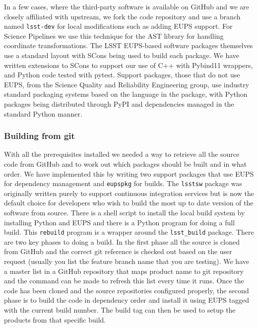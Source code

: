 In a few cases, where the third-party software is available on GitHub and we are closely affiliated with upstream, we fork the code repository and use a branch named \texttt{lsst-dev} for local modifications such as adding EUPS support.
For Science Pipelines we use this technique for the AST library\cite{2016A&C....15...33B} for handling coordinate transformations.
The LSST EUPS-based software packages themselves use a standard layout with SCons\cite{2005Scons1377085} being used to build each package.
We have written extensions to SCons to support our use of C++ with Pybind11 wrappers, and Python code tested with pytest.
Support packages, those that do not use EUPS, from the Science Quality and Reliability Engineering group, use industry standard packaging systems based on the language in the package, with Python packages being distributed through PyPI and dependencies managed in the standard Python manner.

\subsubsection{Building from git}

With all the prerequisites installed we needed a way to retrieve all the source code from GitHub and to work out which packages should be built and in what order.
We have implemented this by writing two support packages that use EUPS for dependency management and \texttt{eupspkg} for builds.
The \texttt{lsstsw} package was originally written purely to support continuous integration services but is now the default choice for developers who wish to build the most up to date version of the software from source.
There is a shell script to install the local build system by installing Python and EUPS and there is a Python program for doing a full build.
This \texttt{rebuild} program is a wrapper around the \texttt{lsst\_build} package.
There are two key phases to doing a build.
In the first phase all the source is cloned from GitHub and the correct git reference is checked out based on the user request (usually you list the feature branch name that you are testing).
We have a master list in a GitHub repository that maps product name to git repository and the command can be made to refresh this list every time it runs.
Once the code has been cloned and the source repositories configured properly, the second phase is to build the code in dependency order and install it using EUPS tagged with the current build number.
The build tag can then be used to setup the products from that specific build.

